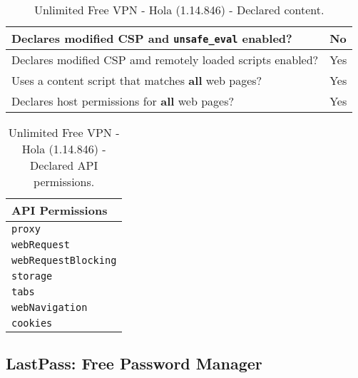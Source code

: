\begin{table}[h]
	\centering
	\begin{tabular}{|l|l|} \hline
		Declares modified CSP and \texttt{unsafe\_eval} enabled? & No \\ \hline
		Declares modified CSP amd remotely loaded scripts enabled? & Yes \\ \hline
		Uses a content script that matches \textbf{all} web pages? & Yes \\ \hline
		Declares host permissions for \textbf{all} web pages? & Yes \\ \hline
	\end{tabular}
	\caption{Unlimited Free VPN - Hola (1.14.846) - Declared content.}
\end{table}
\begin{table}[h]
	\centering
	\begin{tabular}{|l|} \hline
		\textbf{API Permissions} \\ \hline
		\texttt{proxy} \\
		\texttt{webRequest} \\
		\texttt{webRequestBlocking} \\
		\texttt{storage} \\
		\texttt{tabs} \\
		\texttt{webNavigation} \\
		\texttt{cookies} \\
		\hline
	\end{tabular}
	\caption{Unlimited Free VPN - Hola (1.14.846) - Declared API permissions.}
\end{table}
\newpage
\subsection{LastPass: Free Password Manager}

